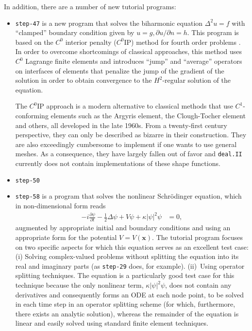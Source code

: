 \documentclass{ansarticle-preprint}
\newcommand{\specialword}[1]{\texttt{#1}}
\newcommand{\dealii}{{\specialword{deal.II}}\xspace}
\begin{document}
In addition, there are a number of new tutorial programs:
\begin{itemize}
  \item \texttt{step-47} is a new program that solves the biharmonic
        equation $\Delta^2 u = f$ with
        ``clamped'' boundary condition given by $u=g, \partial u/\partial
          n=h$. This program is based on the $C^0$ interior
        penalty ($C^0$IP) method for fourth order problems
        \cite{Brenner2005}. In order to overcome
        shortcomings of classical approaches, this method uses $C^0$ Lagrange finite
        elements and introduces ``jump'' and ``average'' operators on
        interfaces of elements that penalize the jump of the gradient of the
        solution in order to obtain convergence to the $H^2$-regular
        solution of the equation.

        The $C^0$IP approach is a modern alternative to classical methods that
        use $C^1$-conforming elements such as the Argyris
        element, the Clough-Tocher element and others, all developed in the
        late 1960s. From a twenty-first century perspective, they can only be
        described as bizarre in their construction. They are also exceedingly
        cumbersome to implement if one wants to use general meshes. As a
        consequence, they have largely fallen out of favor and \dealii{} currently
        does not contain implementations of these shape functions.

  \item \texttt{step-50}

  \item \texttt{step-58} is a program that solves the nonlinear
        Schr{\"o}dinger equation, which in non-dimensional form reads
        \begin{align*}
          - i \frac{\partial \psi}{\partial t}
          - \frac 12 \Delta \psi
          + V \psi
          + \kappa |\psi|^2 \psi
           & = 0,
        \end{align*}
        augmented by appropriate initial and boundary conditions and using
        an appropriate form for the potential $V=V(\mathbf x)$. The
        tutorial program focuses on two specific aspects for which this
        equation serves as an excellent test case: (i) Solving
        complex-valued problems without splitting the equation into its
        real and imaginary parts (as \texttt{step-29} does, for
        example). (ii)~Using operator splitting techniques. The equation is
        a particularly good test case for this technique because the only
        nonlinear term, $\kappa |\psi|^2 \psi$, does not contain any
        derivatives and consequently forms an ODE at each node point, to be
        solved in each time
        step in an operator splitting scheme (for which, furthermore, there
        exists an analytic solution), whereas the remainder of the
        equation is linear and easily solved using standard finite element
        techniques.


\end{itemize}
\end{document}
